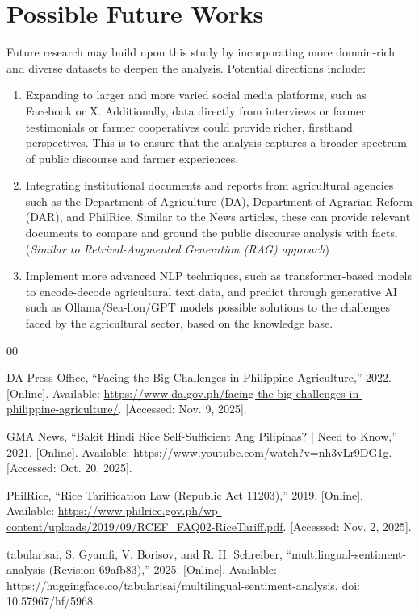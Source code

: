 \documentclass[conference]{IEEEtran}
\begin{document}
\section{Possible Future Works}

Future research may build upon this study by incorporating more domain-rich and diverse datasets to deepen the analysis. Potential directions include:
\begin{enumerate}
    \item Expanding to larger and more varied social media platforms, such as Facebook or X. Additionally, data directly from interviews or farmer testimonials or farmer cooperatives could provide richer, firsthand perspectives. This is to ensure that the analysis captures a broader spectrum of public discourse and farmer experiences.
    \item Integrating institutional documents and reports from agricultural agencies such as the Department of Agriculture (DA), Department of Agrarian Reform (DAR), and PhilRice. Similar to the News articles, these can provide relevant documents to compare and ground the public discourse analysis with facts. (\textit{Similar to Retrival-Augmented Generation (RAG) approach})
    \item Implement more advanced NLP techniques, such as transformer-based models to encode-decode agricultural text data, and predict through generative AI such as Ollama/Sea-lion/GPT models possible solutions to the challenges faced by the agricultural sector, based on the knowledge base.
\end{enumerate}

\sloppy

\newpage \begin{thebibliography}{00}

DA Press Office, ``Facing the Big Challenges in Philippine Agriculture,'' 2022. [Online]. Available: \url{https://www.da.gov.ph/facing-the-big-challenges-in-philippine-agriculture/}. [Accessed: Nov. 9, 2025].

GMA News, ``Bakit Hindi Rice Self-Sufficient Ang Pilipinas? | Need to Know,'' 2021. [Online]. Available: \url{https://www.youtube.com/watch?v=nh3vLr9DG1g}. [Accessed: Oct. 20, 2025].

PhilRice, ``Rice Tariffication Law (Republic Act 11203),'' 2019. [Online]. Available: \url{https://www.philrice.gov.ph/wp-content/uploads/2019/09/RCEF_FAQ02-RiceTariff.pdf}. [Accessed: Nov. 2, 2025].

tabularisai, S. Gyamfi, V. Borisov, and R. H. Schreiber, “multilingual-sentiment-analysis (Revision 69afb83),” 2025. [Online]. Available: https://huggingface.co/tabularisai/multilingual-sentiment-analysis. doi: 10.57967/hf/5968.


\end{thebibliography}
\end{document}
